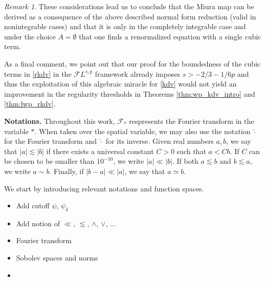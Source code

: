 \documentclass[%
11pt,  reqno]{amsart}
\newcommand{\red}{\color{red}}
\newcommand{\5}{\textup{V}}
\newcommand{\les}{\lesssim}
\newcommand{\dl}{\delta}
\theoremstyle{remark}
\newtheorem{remark}[theorem]{Remark}
\numberwithin{equation}{section}
\numberwithin{theorem}{section}
\begin{document}
\begin{remark}
		These considerations lead us to conclude that the Miura map can be derived as a consequence of the above described normal form reduction (valid in nonintegrable cases) and that it is only in the completely integrable case and under the choice $A=\emptyset$ that one finds a renormalized equation with a single cubic term.
		
		As a final comment, we point out that our proof for the boundedness of the cubic terms in \eqref{rkdv} in the $\mathcal{F}L^{s,p}$ framework already imposes $s>-2/3-1/6p$ and thus the exploitation of this algebraic miracle for \eqref{kdv} would not yield an improvement in the regularity thresholds in Theorems \ref{thm:wp_kdv_intro} and \ref{thm:lwp_rkdv}. 
	\end{remark}
	
	\textbf{Notations.} Throughout this work, $\mathcal{F}_\ast$ respresents the Fourier transform in the variable $\ast$. When taken over the spatial variable, we may also use the notation $\hat{\cdot}$ for the Fourier transform and $\check{\cdot}$ for its inverse. Given real numbers $a,b$, we say that $|a|\lesssim |b|$ if there exists a universal constant $C>0$ such that $a<Cb$. If $C$ can be chosen to be smaller than $10^{-10}$, we write $|a|\ll |b|$. If both $a\lesssim b$ and $b\lesssim a$, we write $a\sim b$. Finally, if $|b-a|\ll |a|$, we say that $a\simeq b$.
	
	
	We start by introducing relevant notations and function spaces.
	
	
	{
		\red
		\begin{itemize}
			\item Add cutoff $\psi$, $\psi_\dl$
			
			\item Add notion of $\ll$, $\les$, $\land$, $\lor$, ...
			
			\item Fourier transform
			
			\item Sobolev spaces and norms
			
			\item 
			
			
		\end{itemize}
	}
	
\end{document}
